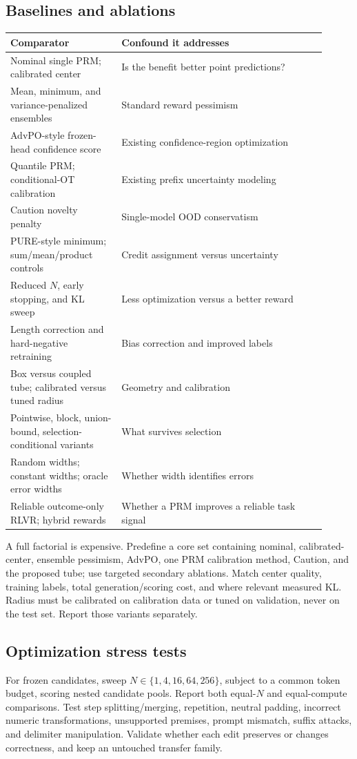 \subsection{Baselines and ablations}
\begin{longtable}{p{0.32\linewidth}p{0.59\linewidth}}
\toprule Comparator & Confound it addresses \\
\midrule\endhead
Nominal single PRM; calibrated center & Is the benefit better point predictions? \\
Mean, minimum, and variance-penalized ensembles & Standard reward pessimism \\
AdvPO-style frozen-head confidence score & Existing confidence-region optimization \\
Quantile PRM; conditional-OT calibration & Existing prefix uncertainty modeling \\
Caution novelty penalty & Single-model OOD conservatism \\
PURE-style minimum; sum/mean/product controls & Credit assignment versus uncertainty \\
Reduced $N$, early stopping, and KL sweep & Less optimization versus a better reward \\
Length correction and hard-negative retraining & Bias correction and improved labels \\
Box versus coupled tube; calibrated versus tuned radius & Geometry and calibration \\
Pointwise, block, union-bound, selection-conditional variants & What survives selection \\
Random widths; constant widths; oracle error widths & Whether width identifies errors \\
Reliable outcome-only RLVR; hybrid rewards & Whether a PRM improves a reliable task signal \\
\bottomrule
\end{longtable}
A full factorial is expensive. Predefine a core set containing nominal,
calibrated-center, ensemble pessimism, AdvPO, one PRM calibration method, Caution,
and the proposed tube; use targeted secondary ablations. Match center quality,
training labels, total generation/scoring cost, and where relevant measured KL.
Radius must be calibrated on calibration data or tuned on validation, never on
the test set. Report those variants separately.

\subsection{Optimization stress tests}
For frozen candidates, sweep $N\in\{1,4,16,64,256\}$, subject to a common token
budget, scoring nested candidate pools. Report both equal-$N$ and equal-compute
comparisons. Test step splitting/merging, repetition, neutral padding, incorrect
numeric transformations, unsupported premises, prompt mismatch, suffix attacks,
and delimiter manipulation. Validate whether each edit preserves or changes
correctness, and keep an untouched transfer family.

